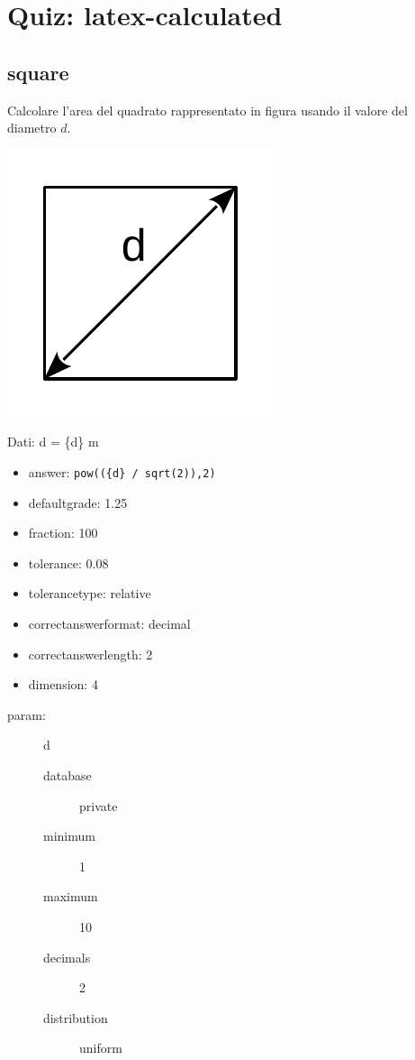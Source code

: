\documentclass{article}
\begin{document}
	

\section{Quiz: latex-calculated}

\subsection{square}
Calcolare l'area del quadrato rappresentato in figura usando il valore del diametro $d$.

\includegraphics[width=0.3\columnwidth]{./img/square}

Dati: d = \{d\} m

\begin{itemize}
	\item answer: \texttt{pow((\{d\} / sqrt(2)),2)}
	\item defaultgrade: 1.25
	\item fraction: 100
	\item tolerance: 0.08
	\item tolerancetype: relative %
	\item correctanswerformat: decimal %
	\item correctanswerlength: 2
	\item dimension: 4
\end{itemize}

\begin{description}
	\item[param:] d
	\begin{description}
		\item[database] private  %
		\item[minimum] 1          %
		\item[maximum] 10          %
		\item[decimals] 2          %
		\item[distribution] uniform   %
	\end{description}
\end{description}
\end{document}
